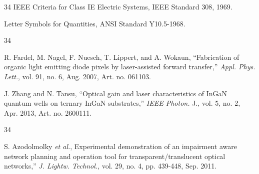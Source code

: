 \documentclass{IEEEjmw}
\begin{document}
\vspace*{-12pt}

\begin{thebibliography}{34}
\setcounter{enumiv}{29}
\bibitem{}IEEE Criteria for Class IE Electric Systems, IEEE Standard 308, 1969.

\bibitem{} Letter Symbols for Quantities, ANSI Standard Y10.5-1968.
\end{thebibliography}

\vspace*{-12pt}

\begin{thebibliography}{34}

\setcounter{enumiv}{31}

\bibitem{}R. Fardel, M. Nagel, F. Nuesch, T. Lippert, and A. Wokaun, ``Fabrication of organic light emitting diode pixels by laser-assisted forward transfer,'' {\em Appl. Phys. Lett.}, vol. 91, no. 6, Aug. 2007, Art. no. 061103. %

\bibitem{} J. Zhang and N. Tansu, ``Optical gain and laser characteristics of InGaN quantum wells on ternary InGaN substrates,'' {\em IEEE Photon.} J., vol. 5, no. 2, Apr. 2013, Art. no. 2600111. %
\end{thebibliography}

\vspace*{-12pt}

\begin{thebibliography}{34}
\setcounter{enumiv}{33}

\bibitem{}S. Azodolmolky {\em et al.}, Experimental demonstration of an impairment aware network planning and operation tool for transparent/translucent optical networks,'' {\em J. Lightw. Technol.}, vol. 29, no. 4, pp. 439-448, Sep. 2011.
\end{thebibliography}\vspace*{5pt}
\end{document}
